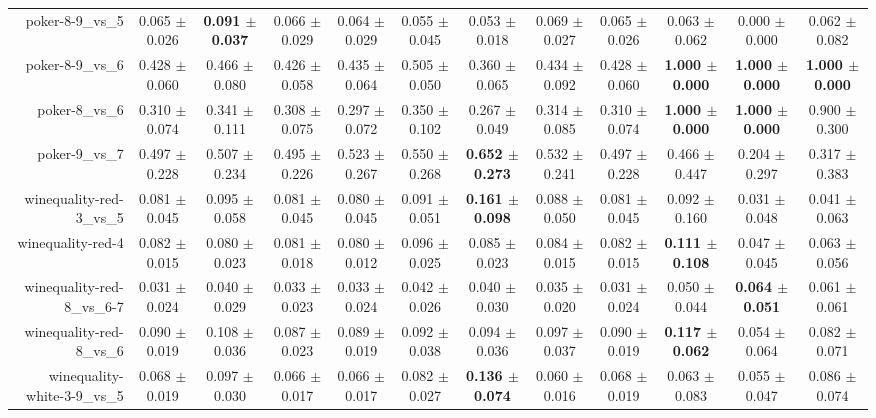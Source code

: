 \begin{table}[!ht]
{\begin{tabular}{r c c c c c c c c c c c}
poker-8-9\_vs\_5 & 0.065 $\pm$ 0.026 & \textbf{0.091 $\pm$ 0.037} & 0.066 $\pm$ 0.029 & 0.064 $\pm$ 0.029 & 0.055 $\pm$ 0.045 & 0.053 $\pm$ 0.018 & 0.069 $\pm$ 0.027 & 0.065 $\pm$ 0.026 & 0.063 $\pm$ 0.062 & 0.000 $\pm$ 0.000 & 0.062 $\pm$ 0.082 \\
poker-8-9\_vs\_6 & 0.428 $\pm$ 0.060 & 0.466 $\pm$ 0.080 & 0.426 $\pm$ 0.058 & 0.435 $\pm$ 0.064 & 0.505 $\pm$ 0.050 & 0.360 $\pm$ 0.065 & 0.434 $\pm$ 0.092 & 0.428 $\pm$ 0.060 & \textbf{1.000 $\pm$ 0.000} & \textbf{1.000 $\pm$ 0.000} & \textbf{1.000 $\pm$ 0.000} \\
poker-8\_vs\_6 & 0.310 $\pm$ 0.074 & 0.341 $\pm$ 0.111 & 0.308 $\pm$ 0.075 & 0.297 $\pm$ 0.072 & 0.350 $\pm$ 0.102 & 0.267 $\pm$ 0.049 & 0.314 $\pm$ 0.085 & 0.310 $\pm$ 0.074 & \textbf{1.000 $\pm$ 0.000} & \textbf{1.000 $\pm$ 0.000} & 0.900 $\pm$ 0.300 \\
poker-9\_vs\_7 & 0.497 $\pm$ 0.228 & 0.507 $\pm$ 0.234 & 0.495 $\pm$ 0.226 & 0.523 $\pm$ 0.267 & 0.550 $\pm$ 0.268 & \textbf{0.652 $\pm$ 0.273} & 0.532 $\pm$ 0.241 & 0.497 $\pm$ 0.228 & 0.466 $\pm$ 0.447 & 0.204 $\pm$ 0.297 & 0.317 $\pm$ 0.383 \\
winequality-red-3\_vs\_5 & 0.081 $\pm$ 0.045 & 0.095 $\pm$ 0.058 & 0.081 $\pm$ 0.045 & 0.080 $\pm$ 0.045 & 0.091 $\pm$ 0.051 & \textbf{0.161 $\pm$ 0.098} & 0.088 $\pm$ 0.050 & 0.081 $\pm$ 0.045 & 0.092 $\pm$ 0.160 & 0.031 $\pm$ 0.048 & 0.041 $\pm$ 0.063 \\
winequality-red-4 & 0.082 $\pm$ 0.015 & 0.080 $\pm$ 0.023 & 0.081 $\pm$ 0.018 & 0.080 $\pm$ 0.012 & 0.096 $\pm$ 0.025 & 0.085 $\pm$ 0.023 & 0.084 $\pm$ 0.015 & 0.082 $\pm$ 0.015 & \textbf{0.111 $\pm$ 0.108} & 0.047 $\pm$ 0.045 & 0.063 $\pm$ 0.056 \\
winequality-red-8\_vs\_6-7 & 0.031 $\pm$ 0.024 & 0.040 $\pm$ 0.029 & 0.033 $\pm$ 0.023 & 0.033 $\pm$ 0.024 & 0.042 $\pm$ 0.026 & 0.040 $\pm$ 0.030 & 0.035 $\pm$ 0.020 & 0.031 $\pm$ 0.024 & 0.050 $\pm$ 0.044 & \textbf{0.064 $\pm$ 0.051} & 0.061 $\pm$ 0.061 \\
winequality-red-8\_vs\_6 & 0.090 $\pm$ 0.019 & 0.108 $\pm$ 0.036 & 0.087 $\pm$ 0.023 & 0.089 $\pm$ 0.019 & 0.092 $\pm$ 0.038 & 0.094 $\pm$ 0.036 & 0.097 $\pm$ 0.037 & 0.090 $\pm$ 0.019 & \textbf{0.117 $\pm$ 0.062} & 0.054 $\pm$ 0.064 & 0.082 $\pm$ 0.071 \\
winequality-white-3-9\_vs\_5 & 0.068 $\pm$ 0.019 & 0.097 $\pm$ 0.030 & 0.066 $\pm$ 0.017 & 0.066 $\pm$ 0.017 & 0.082 $\pm$ 0.027 & \textbf{0.136 $\pm$ 0.074} & 0.060 $\pm$ 0.016 & 0.068 $\pm$ 0.019 & 0.063 $\pm$ 0.083 & 0.055 $\pm$ 0.047 & 0.086 $\pm$ 0.074 \\

\end{tabular}}
\end{table}
